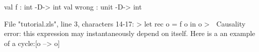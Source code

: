 \runverbatimfalse
{}
\begin{RunVerbatimMsg}
val f : int -D-> int
val wrong : unit -D-> int
\end{RunVerbatimMsg}
\begin{RunVerbatimErr}
File "tutorial.zls", line 3, characters 14-17:
>  let rec o = f o in o
>              ^^^
Causality error: this expression may instantaneously depend on itself.
Here is a an example of a cycle:[o --> o]
\end{RunVerbatimErr}

